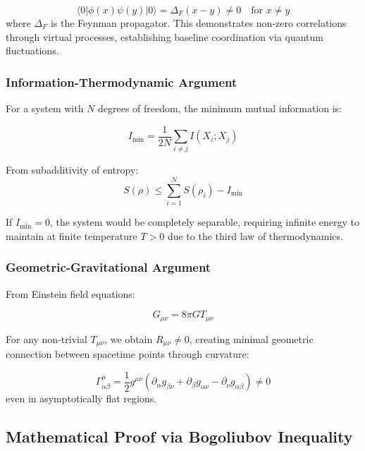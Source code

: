\documentclass[11pt,a4paper]{article}
\begin{document}
\begin{equation}
	\langle 0 | \phi(x) \psi(y) | 0 \rangle = \Delta_F(x-y) \neq 0 \quad \text{for } x \neq y
\end{equation}
where $\Delta_F$ is the Feynman propagator. This demonstrates non-zero correlations through virtual processes, establishing baseline coordination via quantum fluctuations.

\subsubsection{Information-Thermodynamic Argument}

For a system with $N$ degrees of freedom, the minimum mutual information is:

\begin{equation}
	I_{\min} = \frac{1}{2N} \sum_{i \neq j} I(X_i; X_j)
\end{equation}

From subadditivity of entropy:
\begin{equation}
	S(\rho) \leq \sum_{i=1}^N S(\rho_i) - I_{\min}
\end{equation}

If $I_{\min} = 0$, the system would be completely separable, requiring infinite energy to maintain at finite temperature $T > 0$ due to the third law of thermodynamics.

\subsubsection{Geometric-Gravitational Argument}

From Einstein field equations:

\begin{equation}
	G_{\mu\nu} = 8\pi G T_{\mu\nu}
\end{equation}

For any non-trivial $T_{\mu\nu}$, we obtain $R_{\mu\nu} \neq 0$, creating minimal geometric connection between spacetime points through curvature:

\begin{equation}
	\Gamma^\mu_{\alpha\beta} = \frac{1}{2} g^{\mu\nu}(\partial_\alpha g_{\beta\nu} + \partial_\beta g_{\alpha\nu} - \partial_\nu g_{\alpha\beta}) \neq 0
\end{equation}
even in asymptotically flat regions.

\subsection{Mathematical Proof via Bogoliubov Inequality}
\end{document}

